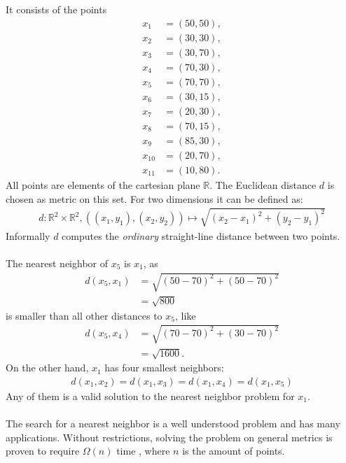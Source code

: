 	It consists of the points
	\begin{align*}
		x_1		&= (50, 50),\\
		x_2		&= (30, 30),\\
		x_3		&= (30, 70),\\
		x_4		&= (70, 30),\\
		x_5		&= (70, 70),\\
		x_6		&= (30, 15),\\
		x_7		&= (20, 30),\\
		x_8		&= (70, 15),\\
		x_9		&= (85, 30),\\
		x_{10}	&= (20, 70),\\
		x_{11}	&= (10, 80).
	\end{align*}
	All points are elements of the cartesian plane $\mathbb{R}$. The Euclidean distance $d$ is chosen as metric on this set.
	For two dimensions it can be defined as:
	\begin{align*}
		d: \mathbb{R}^2 \times \mathbb{R}^2, ((x_1, y_1), (x_2, y_2)) \mapsto \sqrt{(x_2 - x_1)^2 + (y_2 - y_1)^2}
	\end{align*}
	Informally $d$ computes the \textit{ordinary} straight-line distance between two points.\\\\
	The nearest neighbor of $x_5$ is $x_1$, as
	\begin{align*}
		d(x_5, x_1)	&= \sqrt{(50 - 70)^2 + (50 - 70)^2}\\
				&= \sqrt{800}
	\end{align*}
	is smaller than all other distances to $x_5$, like
	\begin{align*}
		d(x_5, x_4)	&= \sqrt{(70 - 70)^2 + (30 - 70)^2}\\
				&= \sqrt{1600}.
	\end{align*}
	On the other hand, $x_1$ has four smallest neighbors:
	\begin{align*}
		d(x_1, x_2) = d(x_1, x_3) = d(x_1, x_4) = d(x_1, x_5)
	\end{align*}
	Any of them is a valid solution to the nearest neighbor problem for $x_1$.\\\\
	The search for a nearest neighbor is a well understood problem  and has many
	applications. Without restrictions, solving the problem on general metrics is proven to
	require $\Omega(n)$ time , where $n$ is the amount of points.
	
